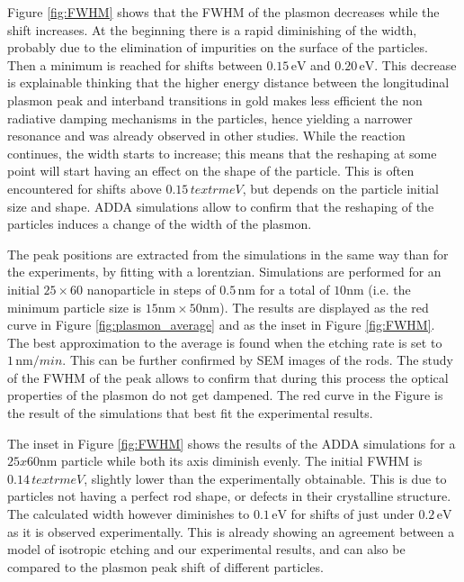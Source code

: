 \documentclass{article}
\begin{document}
Figure \ref{fig:FWHM} shows that the FWHM of the plasmon decreases while the
shift increases. At the beginning there is a rapid diminishing of the width,
probably due to the elimination of impurities on the surface of the particles.
Then a minimum is reached for shifts between $0.15\,\textrm{eV}$ and
$0.20\,\textrm{eV}$. This decrease is explainable thinking that the higher 
energy distance between the longitudinal plasmon peak and interband transitions
in gold makes less efficient the non radiative damping mechanisms in the
particles, hence yielding a narrower resonance and was already observed in
other studies\cite{Sonnichsen2002}. While the reaction continues, the width
starts to increase; this means that the reshaping at some point will start having an
effect on the shape of the particle. This is often encountered for shifts above
$0.15\,textrm{eV}$, but depends on the particle initial size and shape. ADDA
simulations allow to confirm that the reshaping of the particles induces a
change of the width of the plasmon.


The peak positions are extracted from the simulations in the same way than for
the experiments, by fitting with a lorentzian. Simulations are performed for an
initial $25\times60$ nanoparticle in steps of $0.5\,\textrm{nm}$ for a total of
$10\textrm{nm}$ (i.e. the minimum particle size is $15\textrm{nm}\times 50
\textrm{nm}$). The results are displayed as the red curve in Figure
\ref{fig:plasmon_average} and as the inset in Figure \ref{fig:FWHM}. The best
approximation to the average is found when the etching rate is set to
$1\,\textrm{nm}/min$. This can be further confirmed by SEM images of the rods.
The study of the FWHM of the peak allows to confirm that during this process the
optical properties of the plasmon do not get dampened.
The red curve in the Figure is the result of the simulations that best
fit the experimental results.

The inset in Figure \ref{fig:FWHM} shows the results of the
ADDA\cite{Yurkin2011} simulations for a $25x60$nm particle while both its axis
diminish evenly. The initial FWHM is $0.14\,textrm{eV}$, slightly lower
than the experimentally obtainable. This is due to particles not having a
perfect rod shape, or defects in their crystalline structure. The calculated
width however diminishes to $0.1\,\textrm{eV}$ for shifts of just under
$0.2\,\textrm{eV}$ as it is observed experimentally. This is already showing an
agreement between a model of isotropic etching and our experimental results, and
can also be compared to the plasmon peak shift of different particles.
\end{document}
